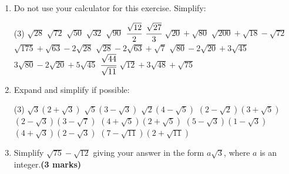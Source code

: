 \documentclass[fleqn]{article}
\begin{document}
\exercise{}
\begin{enumerate}
    \item Do not use your calculator for this exercise. Simplify:
        \begin{tasks}(3) %
            \task $\sqrt{28}$                            %
            \task $\sqrt{72}$                            %
            \task $\sqrt{50}$                            %
            \task $\sqrt{32}$                            %
            \task $\sqrt{90}$                            %
            \task $\cfrac{\sqrt{12}}{2}$\vspace{-1mm}    %
            \task $\cfrac{\sqrt{27}}{3}$                 %
            \task $\sqrt{20}+\sqrt{80}$                  %
            \task $\sqrt{200}+\sqrt{18}-\sqrt{72}$       %
            \task $\sqrt{175}+\sqrt{63}-2\sqrt{28}$      %
            \task $\sqrt{28}-2\sqrt{63}+\sqrt{7}$        %
            \task $\sqrt{80}-2\sqrt{20}+3\sqrt{45}$      %
            \task $3\sqrt{80}-2\sqrt{20}+5\sqrt{45}$     %
            \task $\cfrac{\sqrt{44}}{\sqrt{11}}$         %
            \task $\sqrt{12}+3\sqrt{48}+\sqrt{75}$       %
        \end{tasks}
    \item Expand and simplify if possible:
        \begin{tasks}(3) %
            \task $\sqrt{3}(2+\sqrt{3})$                 %
            \task $\sqrt{5}(3-\sqrt{3})$                 %
            \task $\sqrt{2}(4-\sqrt{5})$                 %
            \task $(2-\sqrt{2})(3+\sqrt{5})$             %
            \task $(2-\sqrt{3})(3-\sqrt{7})$             %
            \task $(4+\sqrt{5})(2+\sqrt{5})$             %
            \task $(5-\sqrt{3})(1-\sqrt{3})$             %
            \task $(4+\sqrt{3})(2-\sqrt{3})$             %
            \task $(7-\sqrt{11})(2+\sqrt{11})$           %
        \end{tasks}
    \item Simplify $\sqrt{75}-\sqrt{12}$ giving your answer in the form $a\sqrt{3}$, where $a$ is an integer.\hfill\textbf{(3 marks)} %
\end{enumerate}
\end{document}
